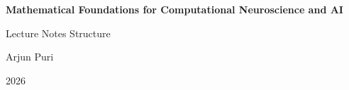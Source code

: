 \begin{titlepage}
\centering
\vspace*{0.18\textheight}
{\Huge\bfseries Mathematical Foundations for Computational Neuroscience and AI\par}
\vspace{1.5em}
{\Large Lecture Notes Structure\par}
\vspace{2em}
{\large Arjun Puri\par}
\vfill
{\large 2026\par}
\end{titlepage}
